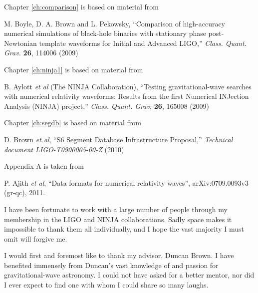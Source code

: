 \documentclass[12pt,notitlepage]{report}
\begin{document}
\vspace*{0.5cm}

\noindent Chapter \ref{ch:comparison} is based on material from

\vspace*{0.25cm}

\noindent M. Boyle, D. A. Brown and L. Pekowsky, ``Comparison of high-accuracy
numerical simulations of black-hole binaries with stationary phase
post-Newtonian template waveforms for Initial and Advanced LIGO,''
{\it Class. Quant. Grav.} {\bf 26}, 114006 (2009)

\vspace*{0.5cm}

\noindent Chapter \ref{ch:ninja1} is based on material from

\vspace*{0.25cm}

\noindent B. Aylott {\it et al} (The NINJA Collaboration), ``Testing
gravitational-wave searches with numerical relativity waveforms:
Results from the first Numerical INJection Analysis (NINJA) project,''
{\it Class. Quant. Grav.} {\bf 26}, 165008 (2009)


\vspace*{0.5cm}

\noindent Chapter \ref{ch:segdb} is based on material from

\vspace*{0.25cm}

\noindent D. Brown {\it et al}, ``S6 Segment Database
Infrastructure Proposal,'' {\it Technical document
{LIGO}-T0900005-00-Z} (2010)


\vspace*{0.5cm}

\noindent Appendix A is taken from

\vspace*{0.25cm}

\noindent P. Ajith {\it et al}, ``Data formats for numerical
relativity waves'', arXiv:0709.0093v3 (gr-qc), 2011.


I have been fortunate to work with a large number of people through my
membership in the LIGO and NINJA collaborations.  Sadly space makes it
impossible to thank them all individually, and I hope the vast
majority I must omit will forgive me.

I would first and foremost like to thank my advisor, Duncan Brown.  I
have benefited immensely from Duncan's vast knowledge of and passion
for gravitational-wave astronomy.  I could not have asked for a better
mentor, nor did I ever expect to find one with whom I could share so
many laughs.
\end{document}
